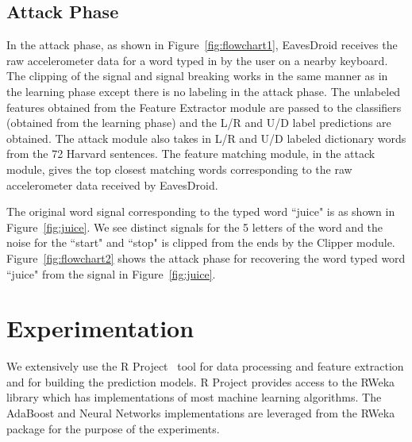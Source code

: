 \documentclass[11pt,conference]{IEEEtran}
\begin{document}
\subsection{Attack Phase}
\label{sec:attacking}
In the attack phase, as shown in Figure~\ref{fig:flowchart1}, EavesDroid receives the raw accelerometer data for a word
typed in by the user on a nearby keyboard. The clipping of the signal and signal breaking
works in the same manner as in the learning phase except there is no labeling in the attack
phase. The unlabeled features obtained from the Feature Extractor module are passed
to the classifiers (obtained from the learning phase) and the L/R and U/D label predictions
are obtained. The attack module also takes in L/R and U/D labeled dictionary words from the
72 Harvard sentences. The feature matching module, in the attack module, gives the top
closest matching words corresponding to the raw accelerometer data received by EavesDroid.

The original word signal corresponding to the typed word ``juice" is as shown in Figure~\ref{fig:juice}.
We see distinct signals for the 5 letters of the word and the noise for the ``start" and ``stop" is clipped
from the ends by the Clipper module. Figure~\ref{fig:flowchart2} shows the attack phase for recovering
the word typed word ``juice" from the signal in Figure~\ref{fig:juice}.

\section{Experimentation}
\label{sec:experimentation}
We extensively use the R Project~\cite{r-project} tool for data processing and feature extraction and for building the prediction models. R Project
provides access to the RWeka~\cite{rweka} library which has implementations
of most machine learning algorithms. The AdaBoost and Neural Networks implementations
are leveraged from the RWeka package for the purpose of the experiments.
\end{document}
